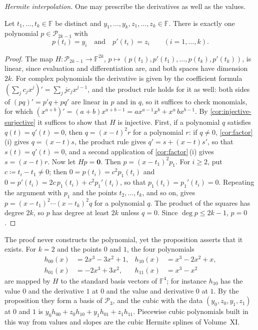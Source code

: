 \emph{Hermite interpolation.} One may prescribe the derivatives as well as the values.

\begin{proposition}
\label{prop:hermite}
Let $t_1,\ldots,t_k\in\mathbb F$ be distinct and $y_1,\ldots,y_k,z_1,\ldots,z_k\in\mathbb F$. There is exactly one polynomial $p\in\mathcal P_{2k-1}$ with
\[
p(t_i)=y_i\quad\text{and}\quad p'(t_i)=z_i\qquad(i=1,\ldots,k).
\]
\end{proposition}

\begin{proof}
The map $H\colon\mathcal P_{2k-1}\to\mathbb F^{2k}$, $p\mapsto(p(t_1),p'(t_1),\ldots,p(t_k),p'(t_k))$, is linear, since evaluation and differentiation are, and both spaces have dimension $2k$. For complex polynomials the derivative is given by the coefficient formula $(\sum_jc_jx^j)'=\sum_jjc_jx^{j-1}$, and the product rule holds for it as well: both sides of $(pq)'=p'q+pq'$ are linear in $p$ and in $q$, so it suffices to check monomials, for which $(x^{a+b})'=(a+b)x^{a+b-1}=ax^{a-1}x^b+x^a\,bx^{b-1}$. By \cref{cor:injective-surjective} it suffices to show that $H$ is injective. First, if a polynomial $q$ satisfies $q(t)=q'(t)=0$, then $q=(x-t)^2r$ for a polynomial $r$: if $q\ne0$, \cref{cor:factor}\,(i) gives $q=(x-t)s$, the product rule gives $q'=s+(x-t)s'$, so that $s(t)=q'(t)=0$, and a second application of \cref{cor:factor}\,(i) gives $s=(x-t)r$. Now let $Hp=\mathbf 0$. Then $p=(x-t_1)^2p_1$. For $i\ge2$, put $c\coloneqq t_i-t_1\ne0$; then $0=p(t_i)=c^2p_1(t_i)$ and $0=p'(t_i)=2c\,p_1(t_i)+c^2p_1'(t_i)$, so that $p_1(t_i)=p_1'(t_i)=0$. Repeating the argument with $p_1$ and the points $t_2,\ldots,t_k$, and so on, gives $p=(x-t_1)^2\cdots(x-t_k)^2q$ for a polynomial $q$. The product of the squares has degree $2k$, so $p$ has degree at least $2k$ unless $q=0$. Since $\deg p\le2k-1$, $p=0$.
\end{proof}

The proof never constructs the polynomial, yet the proposition asserts that it exists. For $k=2$ and the points $0$ and $1$, the four polynomials
\[
\begin{aligned}
h_{00}(x)&=2x^3-3x^2+1,&h_{10}(x)&=x^3-2x^2+x,\\
h_{01}(x)&=-2x^3+3x^2,&h_{11}(x)&=x^3-x^2
\end{aligned}
\]
are mapped by $H$ to the standard basis vectors of $\mathbb F^4$; for instance $h_{10}$ has the value $0$ and the derivative $1$ at $0$ and the value and derivative $0$ at $1$. By the proposition they form a basis of $\mathcal P_3$, and the cubic with the data $(y_0,z_0,y_1,z_1)$ at $0$ and $1$ is $y_0h_{00}+z_0h_{10}+y_1h_{01}+z_1h_{11}$. Piecewise cubic polynomials built in this way from values and slopes are the cubic Hermite splines of Volume~XI.

